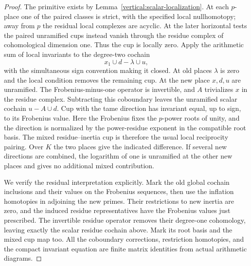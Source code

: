 \begin{proof}
The primitive exists by Lemma~\ref{vertical:scalar-localization}.
At each $p$-place one of the paired classes is strict, with the
specified local nullhomotopy; away from $p$ the residual local
complexes are acyclic.  At the later horizontal tests the paired
unramified cups instead vanish through the residue complex of
cohomological dimension one.  Thus the cup is locally zero.
Apply the
arithmetic sum of local invariants to the degree-two cochain
\begin{equation}\label{vertical:primitive-cup}
 x_1\cup d-\lambda\cup u,
\end{equation}
with the simultaneous sign convention making it closed.  At old
places $\lambda$ is zero and the local condition removes the
remaining cup.  At the new place $x,d,u$ are unramified.  The
Frobenius-minus-one operator is invertible, and $A$ trivializes
$x$ in the residue complex.  Subtracting this coboundary leaves
the unramified scalar cochain $u-A\cup d$.  Cup with the tame
direction has invariant equal, up to sign, to its Frobenius value.
Here the Frobenius fixes the $p$-power roots of unity, and the
direction is normalized by the power-residue exponent in the
compatible root basis.  The mixed residue--inertia cup is therefore
the usual local reciprocity pairing.  Over $K$ the two places
give the indicated difference.  If several new directions are
combined, the logarithm of one is unramified at the other new
places and gives no additional mixed contribution.

We verify the residual interpretation explicitly.  Mark the old
global cochain inclusions and their values on the Frobenius
sequences, then use the inflation homotopies in adjoining the
new primes.  Their restrictions to new inertia are zero, and
the induced residue representatives have the Frobenius values
just prescribed.  The invertible residue operator removes their
degree-one cohomology, leaving exactly the scalar residue
cochain above.  Mark its root basis and the mixed cup map too.
All the coboundary corrections, restriction homotopies, and the
compact invariant equation are finite matrix identities from
actual arithmetic diagrams.


\end{proof}
